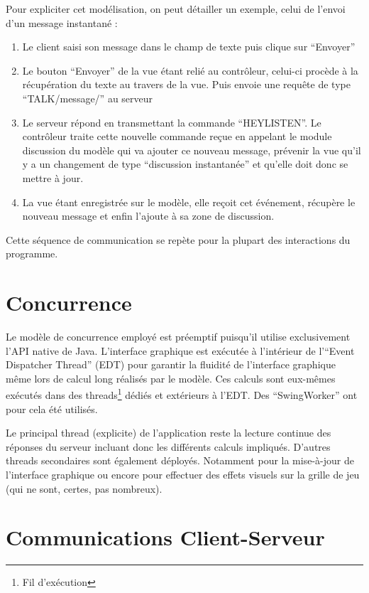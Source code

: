 \documentclass[a4paper, 11pt]{report}
\begin{document}
Pour expliciter cet modélisation, on peut détailler un exemple, celui de l'envoi d'un 
message instantané :
\begin{enumerate}
  \item Le client saisi son message dans le champ de texte puis clique sur ``Envoyer''
  \item Le bouton ``Envoyer'' de la vue étant relié au contrôleur, celui-ci procède à la récupération
    du texte au travers de la vue. Puis envoie une requête de type ``TALK/message/'' au
    serveur
  \item Le serveur répond en transmettant la commande ``HEYLISTEN''. Le contrôleur traite
    cette nouvelle commande reçue en appelant le module discussion du modèle qui va
    ajouter ce nouveau message, prévenir la vue qu'il y a un changement de type
    ``discussion instantanée'' et qu'elle doit donc se mettre à jour.
  \item La vue étant enregistrée sur le modèle, elle reçoit cet événement, récupère le nouveau 
    message et enfin l'ajoute à sa zone de discussion.
\end{enumerate}

Cette séquence de communication se repète pour la plupart des interactions du programme.

\section{Concurrence}

Le modèle de concurrence employé est préemptif puisqu'il utilise exclusivement l'API native de Java.
L'interface graphique est exécutée à l'intérieur de l'``Event Dispatcher Thread'' (EDT) 
pour garantir la fluidité de l'interface graphique même lors de calcul long réalisés par le modèle.
Ces calculs sont eux-mêmes exécutés dans des threads\footnote{Fil d'exécution} dédiés et 
extérieurs à l'EDT. Des ``SwingWorker'' ont pour cela été utilisés.

Le principal thread (explicite) de l'application reste la lecture continue des réponses du serveur
incluant donc les différents calculs impliqués.
D'autres threads secondaires sont également déployés. Notamment pour la mise-à-jour de l'interface
graphique ou encore pour effectuer des effets visuels sur la grille de jeu 
(qui ne sont, certes, pas nombreux).


\section{Communications Client-Serveur}
\end{document}
